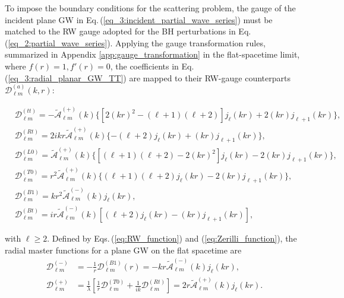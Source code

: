\documentclass[reprint,amsmath,amssymb,aps,prd]{revtex4-2}
\begin{document}
To impose the boundary conditions for the scattering problem, the gauge of the incident plane GW in Eq.\,(\ref{eq_3:incident_partial_wave_series}) must be matched to the RW gauge adopted for the BH perturbations in Eq.\,(\ref{eq_2:partial_wave_series}). Applying the gauge transformation rules, summarized in Appendix \ref{app:gauge_transformation} in the flat-spacetime limit, where $f(r)=1, f'(r)=0$, the coefficients in Eq.\,(\ref{eq_3:radial_planar_GW_TT}) are mapped to their RW-gauge counterparts $\mathscr{D}_{\ell m}^{(a)}(k,r)$:
\begin{widetext}
\begin{subequations}
\label{eq_3:radial_planar_GW_RW}
\begin{align}
&\mathscr{D}_{\ell m}^{(tt)}
=-\tilde{\mathcal{A}}^{(+)}_{\ell m}(k)\{[2(kr)^2-(\ell+1)(\ell+2)]j_{\ell}(kr)+2(kr)j_{\ell+1}(kr)\},\\
&\mathscr{D}_{\ell m}^{(Rt)}
=2ikr\tilde{\mathcal{A}}^{(+)}_{\ell m}(k)
\{-(\ell+2)j_{\ell}(kr)
+(kr)j_{\ell+1}(kr)\},\\
&\mathscr{D}_{\ell m}^{(L0)}
=\tilde{\mathcal{A}}^{(+)}_{\ell m}(k)\{[(\ell+1)(\ell+2)-2(kr)^2]j_{\ell}(kr)
-2(kr)j_{\ell+1}(kr)\},\\
&\mathscr{D}_{\ell m}^{(T0)}
=r^2\tilde{\mathcal{A}}^{(+)}_{\ell m}(k)\{(\ell+1)(\ell+2)j_{\ell}(kr)
-2(kr)j_{\ell+1}(kr)\},\\
&\mathscr{D}_{\ell m}^{(B1)}
=kr^2\tilde{\mathcal{A}}^{(-)}_{\ell m}(k)j_{\ell}(kr),\\
&\mathscr{D}^{(Bt)}_{\ell m}
=ir\tilde{\mathcal{A}}^{(-)}_{\ell m}(k)[(\ell+2)j_{\ell}(kr)
-(kr)j_{\ell+1}(kr)],
\end{align}
\end{subequations}
\end{widetext}
with $\ell\geqslant2$. Defined by Eqs.\,(\ref{eq:RW_function}) and (\ref{eq:Zerilli_function}), the radial master functions for a plane GW on the flat spacetime are
\begin{subequations}
\label{eq_3:planar_GW_master}
\begin{align}
\mathscr{D}^{(-)}_{\ell m}
&=-\frac{1}{r}\mathscr{D}^{(B1)}_{\ell m}(r)=-kr\tilde{\mathcal{A}}^{(-)}_{\ell m}(k)j_{\ell}(kr),\\
\mathscr{D}_{\ell m}^{(+)}
&=\frac{1}{\lambda}\left[\frac{1}{r}
\mathscr{D}_{\ell m}^{(T0)}
+\frac{1}{ik}
\mathscr{D}_{\ell m}^{(Rt)}\right]
=2r\tilde{\mathcal{A}}^{(+)}_{\ell m}(k)j_{\ell}(kr).
\end{align}
\end{subequations}
\end{document}
